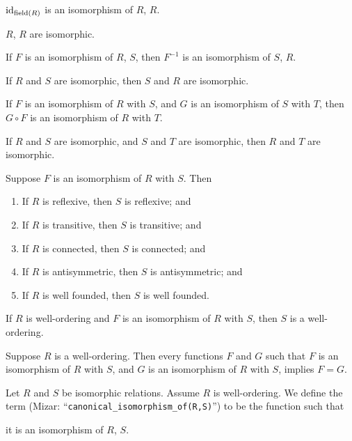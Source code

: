 \documentclass{article}
\begin{document}
\begin{thm}
\item\label{wellord1:37} $\operatorname{id}_{\operatorname{field}(R)}$ is an isomorphism of $R$, $R$.
\item\label{wellord1:38} $R$, $R$ are isomorphic.
\item\label{wellord1:39} If $F$ is an isomorphism of $R$, $S$, then
  $F^{-1}$ is an isomorphism of $S$, $R$.
\item\label{wellord1:40} If $R$ and $S$ are isomorphic, then $S$ and $R$
  are isomorphic.
\item\label{wellord1:41} If $F$ is an isomorphism of $R$ with $S$, and
  $G$ is an isomorphism of $S$ with $T$, then $G\circ F$ is an
  isomorphism of $R$ with $T$.
\item\label{wellord1:42} If $R$ and $S$ are isomorphic, and $S$ and $T$
  are isomorphic, then $R$ and $T$ are isomorphic.
\item\label{wellord1:43} Suppose $F$ is an isomorphism of $R$ with
  $S$. Then
  \begin{enumerate}[label=(\roman*)]
  \item If $R$ is reflexive, then $S$ is reflexive; and
  \item If $R$ is transitive, then $S$ is transitive; and
  \item If $R$ is connected, then $S$ is connected; and
  \item If $R$ is antisymmetric, then $S$ is antisymmetric; and
  \item If $R$ is well founded, then $S$ is well founded.
  \end{enumerate}
\item\label{wellord1:44} If $R$ is well-ordering and $F$ is an
  isomorphism of $R$ with $S$, then $S$ is a well-ordering.
\item\label{wellord1:45} Suppose $R$ is a well-ordering. Then every
  functions $F$ and $G$ such that $F$ is an isomorphism of $R$ with $S$,
  and $G$ is an isomorphism of $R$ with $S$, implies $F=G$.
\end{thm}

\begin{definition}
Let $R$ and $S$ be isomorphic relations. Assume $R$ is well-ordering.
We define the term 
(Mizar: ``\verb#canonical_isomorphism_of(R,S)#'') to be the function
such that
\begin{defn}
\item it is an isomorphism of $R$, $S$.
\end{defn}
\end{definition}
\end{document}
